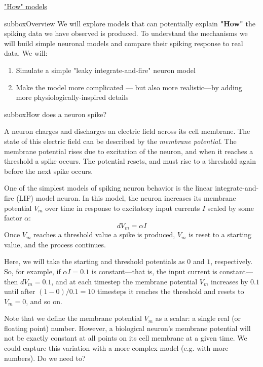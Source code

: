 \begin{textbox}{\href{https://compneuro.neuromatch.io/tutorials/W1D1_ModelTypes/student/W1D1_Tutorial2.html}{"How" models } }
\begin{subbox}{subbox}{Overview }
\scriptsize
We will explore models that can potentially explain \textbf{"How"} the spiking data we have observed is produced. To understand the mechanisms  we will build simple neuronal models and compare their spiking response to real data. We will:
\begin{enumerate}
    \item 
 Simulate a  simple "leaky integrate-and-fire" neuron model 
\item Make the model more complicated — but also more realistic—by adding more physiologically-inspired details
\end{enumerate}
\end{subbox}
\begin{subbox}{subbox}{How does a neuron spike? }
\scriptsize

A neuron charges and discharges an electric field across its cell membrane. The state of this electric field can be described by the \textit{membrane potential}. The membrane potential rises due to excitation of the neuron, and when it reaches a threshold a spike occurs. The potential resets, and must rise to a threshold again before the next spike occurs.

One of the simplest models of spiking neuron behavior is the linear integrate-and-fire (LIF) model neuron. In this model, the neuron increases its membrane potential $V_m$ over time in response to excitatory input currents $I$ scaled by some factor $\alpha$:
\begin{equation}
dV_m = {\alpha}I
\end{equation}
Once $V_m$ reaches a threshold value a spike is produced, $V_m$ is reset to a starting value, and the process continues. 

Here, we will take the starting and threshold potentials as $0$ and $1$, respectively. So, for example, if $\alpha I=0.1$ is constant---that is, the input current is constant---then $dV_m=0.1$, and at each timestep the membrane potential $V_m$ increases by $0.1$ until after $(1-0)/0.1 = 10$ timesteps it reaches the threshold and resets to $V_m=0$, and so on.

Note that we define the membrane potential $V_m$ as a scalar: a single real (or floating point) number. However, a biological neuron's membrane potential will not be exactly constant at all points on its cell membrane at a given time. We could capture this variation with a more complex model (e.g. with more numbers). Do we need to? 


\end{subbox}
\end{textbox}
